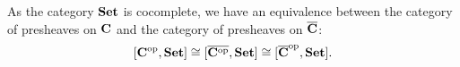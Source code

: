 \begin{corollary}\label{cor:karoubi-presheaf}
  As the category $ \mathbf{Set} $ is cocomplete, we have an equivalence between the category of presheaves on $ \mathbf{C} $ and the category of presheaves on $ \overline {\mathbf{C}} $:
  \[ [\mathbf{C}^{\text{op}}, \mathbf{Set}] \cong [\overline{\mathbf{C}^{\text{op}}}, \mathbf{Set}] \cong [\overline {\mathbf{C}}^{\text{op}}, \mathbf{Set}]. \]
\end{corollary}
